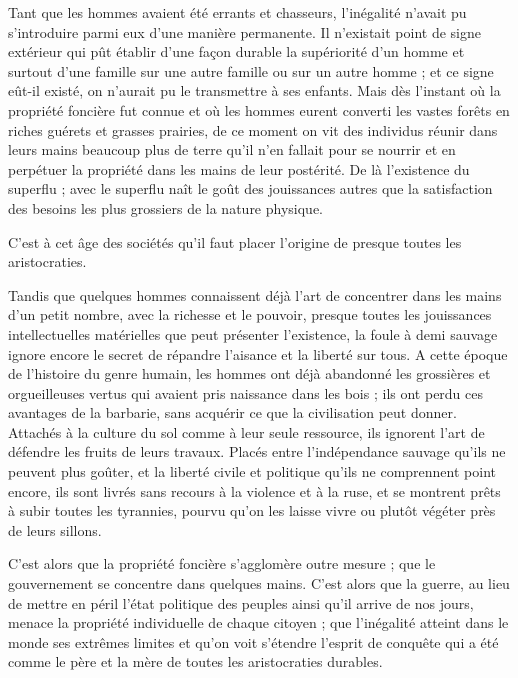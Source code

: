 \documentclass[french,twoside]{book} %
\begin{document}
Tant que les hommes avaient été errants et chasseurs, l’inégalité n’avait pu s’introduire parmi eux d’une manière permanente. Il n’existait point de signe extérieur qui pût établir d’une façon durable la supériorité d’un homme et surtout d’une famille sur une autre famille ou sur un autre homme ; et ce signe eût-il existé, on n’aurait pu le transmettre à ses enfants. Mais dès l’instant où la propriété foncière fut connue et où les hommes eurent converti les vastes forêts en riches guérets et grasses prairies, de ce moment on vit des individus réunir dans leurs mains beaucoup plus de terre qu’il n’en fallait pour se nourrir et en perpétuer la propriété dans les mains de leur postérité. De là l’existence du superflu ; avec le superflu naît le goût des jouissances autres que la satisfaction des besoins les plus grossiers de la nature physique.\par
C'est à cet âge des sociétés qu’il faut placer l’origine de presque toutes les aristocraties.\par
Tandis que quelques hommes connaissent déjà l’art de concentrer dans les mains d’un petit nombre, avec la richesse et le pouvoir, presque toutes les jouissances intellectuelles matérielles que peut présenter l’existence, la foule à demi sauvage ignore encore le secret de répandre l’aisance et la liberté sur tous. A cette époque de l’histoire du genre humain, les hommes ont déjà abandonné les grossières et orgueilleuses vertus qui avaient pris naissance dans les bois ; ils ont perdu ces avantages de la barbarie, sans acquérir ce que la civilisation peut donner. Attachés à la culture du sol comme à leur seule ressource, ils ignorent l’art de défendre les fruits de leurs travaux. Placés entre l’indépendance sauvage qu’ils ne peuvent plus goûter, et la liberté civile et politique qu’ils ne comprennent point encore, ils sont livrés sans recours à la violence et à la ruse, et se montrent prêts à subir toutes les tyrannies, pourvu qu’on les laisse vivre ou plutôt végéter près de leurs sillons.\par
C'est alors que la propriété foncière s’agglomère outre mesure ; que le gouvernement se concentre dans quelques mains. C'est alors que la guerre, au lieu de mettre en péril l’état politique des peuples ainsi qu’il arrive de nos jours, menace la propriété individuelle de chaque citoyen ; que l’inégalité atteint dans le monde ses extrêmes limites et qu’on voit s’étendre l’esprit de conquête qui a été comme le père et la mère de toutes les aristocraties durables.\par
\end{document}
